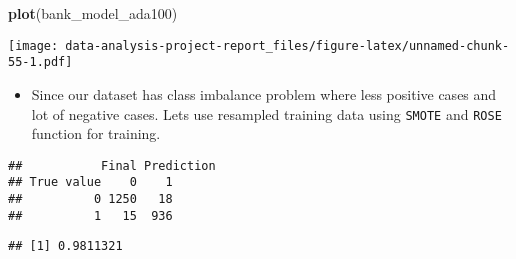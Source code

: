 \documentclass[
]{article}
\newenvironment{Shaded}{\begin{snugshade}}{\end{snugshade}}
\newcommand{\DataTypeTok}[1]{\textcolor[rgb]{0.13,0.29,0.53}{#1}}
\newcommand{\DecValTok}[1]{\textcolor[rgb]{0.00,0.00,0.81}{#1}}
\newcommand{\KeywordTok}[1]{\textcolor[rgb]{0.13,0.29,0.53}{\textbf{#1}}}
\newcommand{\NormalTok}[1]{#1}
\newcommand{\OperatorTok}[1]{\textcolor[rgb]{0.81,0.36,0.00}{\textbf{#1}}}
\newcommand{\StringTok}[1]{\textcolor[rgb]{0.31,0.60,0.02}{#1}}
\providecommand{\tightlist}{%
  \setlength{\itemsep}{0pt}\setlength{\parskip}{0pt}}
\begin{document}
\begin{Shaded}
\begin{Highlighting}[]
\KeywordTok{plot}\NormalTok{(bank_model_ada100)}
\end{Highlighting}
\end{Shaded}

\texttt{[image: data-analysis-project-report\_files/figure-latex/unnamed-chunk-55-1.pdf]}

\begin{itemize}
\tightlist
\item
  Since our dataset has class imbalance problem where less positive
  cases and lot of negative cases. Lets use resampled training data
  using \texttt{SMOTE} and \texttt{ROSE} function for training.
\end{itemize}

\begin{Shaded}
\end{Shaded}

\begin{verbatim}
##           Final Prediction
## True value    0    1
##          0 1250   18
##          1   15  936
\end{verbatim}

\begin{Shaded}
\end{Shaded}

\begin{verbatim}
## [1] 0.9811321
\end{verbatim}

\begin{Shaded}
\end{Shaded}
\end{document}
